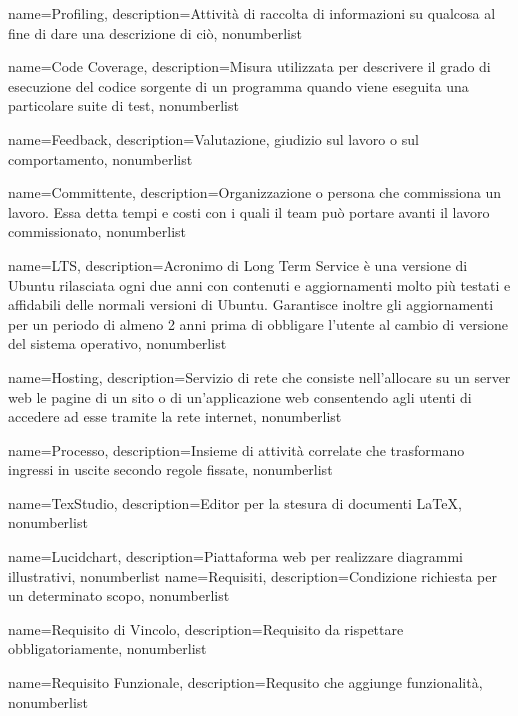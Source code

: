 {
	name={Profiling},
	description={Attività di raccolta di informazioni su qualcosa al fine di dare una descrizione di ciò},
	nonumberlist 
}

{
	name={Code Coverage},
	description={Misura utilizzata per descrivere il grado di esecuzione del codice sorgente di un programma quando viene eseguita una particolare suite di test},
	nonumberlist 
}

{
	name={Feedback},
	description={Valutazione, giudizio sul lavoro o sul comportamento},
	nonumberlist 
}

{
	name={Committente},
	description={Organizzazione o persona che commissiona un lavoro. Essa detta tempi e costi con i quali il team può portare avanti il lavoro commissionato},
	nonumberlist 
}

{
	name={LTS},
	description={Acronimo di Long Term Service è una versione di Ubuntu rilasciata ogni due anni con contenuti e aggiornamenti molto più testati e affidabili delle normali versioni di Ubuntu. Garantisce inoltre gli aggiornamenti per un periodo di almeno 2 anni prima di obbligare l'utente al cambio di versione del sistema operativo},
	nonumberlist 
}

{
	name={Hosting},
	description={Servizio di rete che consiste nell'allocare su un server web le pagine di un sito o di un'applicazione web consentendo agli utenti di accedere ad esse tramite la rete internet},
	nonumberlist 
}

{
	name={Processo},
	description={Insieme di attività correlate che trasformano ingressi in uscite secondo regole fissate},
	nonumberlist 
}

{
	name={TexStudio},
	description={Editor per la stesura di documenti \LaTeX},
	nonumberlist 
}

{
	name={Lucidchart},
	description={Piattaforma web per realizzare diagrammi illustrativi},
	nonumberlist 
}
{
	name={Requisiti},
	description={Condizione richiesta per un determinato scopo},
	nonumberlist 
}

{
	name={Requisito di Vincolo},
	description={Requisito da rispettare obbligatoriamente},
	nonumberlist 
}

{
	name={Requisito Funzionale},
	description={Requsito che aggiunge funzionalità},
	nonumberlist 
}

